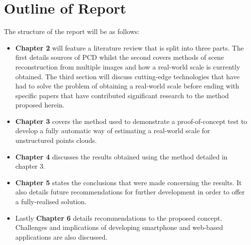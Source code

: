 \section{Outline of Report}
\vspace{-3mm}
The structure of the report will be as follows:
\begin{itemize}
	\item \textbf{Chapter 2} will feature a literature review that is split into three parts. The first details sources of PCD whilst the second covers methods of scene reconstruction from multiple images and how a real-world scale is currently obtained. The third section will discuss cutting-edge technologies that have had to solve the problem of obtaining a real-world scale before ending with specific papers that have contributed significant research to the method proposed herein.
	\item \textbf{Chapter 3} covers the method used to demonstrate a proof-of-concept test to develop a fully automatic way of estimating a real-world scale for unstructured points clouds. 
	\item \textbf{Chapter 4} discusses the results obtained using the method detailed in chapter 3.
	\item \textbf{Chapter 5} states the conclusions that were made concerning the results. It also details future recommendations for further development in order to offer a fully-realised solution.
	\item Lastly \textbf{Chapter 6} details recommendations to the proposed concept. Challenges and implications of developing smartphone and web-based applications are also discussed.
\end{itemize}

